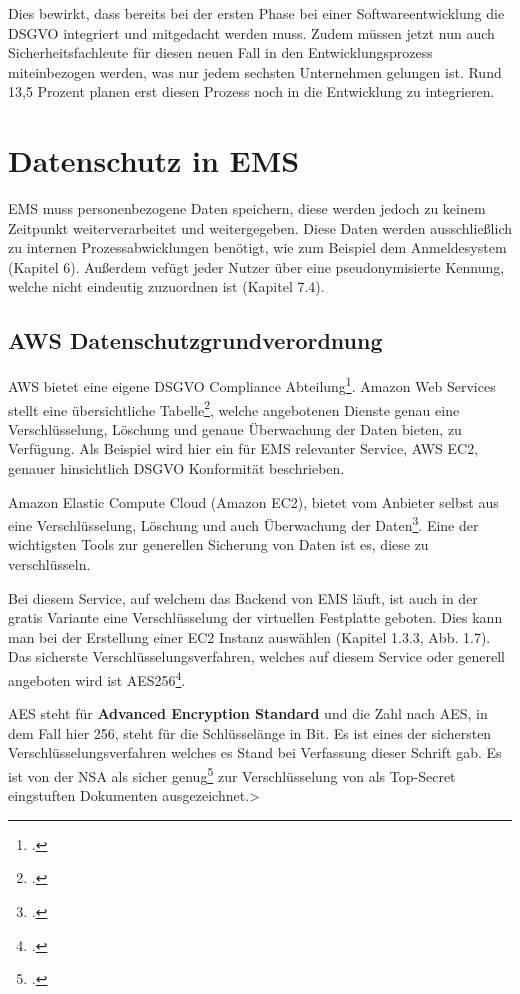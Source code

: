 Dies bewirkt, dass bereits bei der ersten Phase bei einer Softwareentwicklung die DSGVO integriert und mitgedacht werden muss.
Zudem müssen jetzt nun auch Sicherheitsfachleute für diesen neuen Fall in den Entwicklungsprozess miteinbezogen werden, was nur jedem sechsten Unternehmen gelungen ist.
Rund 13,5 Prozent planen erst diesen Prozess noch in die Entwicklung zu integrieren.

\section{Datenschutz in EMS}
EMS muss personenbezogene Daten speichern, diese werden jedoch zu keinem Zeitpunkt weiterverarbeitet und weitergegeben. Diese Daten werden ausschließlich zu internen Prozessabwicklungen benötigt, wie zum Beispiel dem
Anmeldesystem (Kapitel 6). Außerdem vefügt jeder Nutzer über eine pseudonymisierte Kennung, welche nicht eindeutig zuzuordnen ist (Kapitel 7.4).

\subsection{AWS Datenschutzgrundverordnung}
AWS bietet eine eigene DSGVO Compliance Abteilung\footcite{aws-dsgvo}. Amazon Web Services stellt eine übersichtliche Tabelle\footcite{AWS-DSGVO-Tabelle}, welche angebotenen Dienste genau eine Verschlüsselung, Löschung und 
genaue Überwachung der Daten bieten, zu Verfügung. Als Beispiel wird hier ein für EMS relevanter Service, AWS EC2, genauer hinsichtlich DSGVO Konformität beschrieben.

Amazon Elastic Compute Cloud (Amazon EC2), bietet vom Anbieter selbst aus eine Verschlüsselung, Löschung und auch Überwachung der Daten\footcite{aws-ec2-dsgvo-alles}.
Eine der wichtigsten Tools zur generellen Sicherung von Daten ist es, diese zu verschlüsseln.

Bei diesem Service, auf welchem das Backend von EMS läuft, ist auch in der gratis Variante eine Verschlüsselung der virtuellen Festplatte geboten. Dies kann man bei der Erstellung einer EC2 Instanz auswählen
(Kapitel 1.3.3, Abb. 1.7). Das sicherste Verschlüsselungsverfahren, welches auf diesem Service oder generell angeboten wird ist AES256\footcite{aes256}.

AES steht für \textbf{Advanced Encryption Standard} und die Zahl nach AES, in dem
Fall hier 256, steht für die Schlüsselänge in Bit. Es ist eines der sichersten Verschlüsselungsverfahren welches es Stand bei Verfassung dieser Schrift gab. Es ist von der NSA als sicher genug\footcite{nsa-aws} zur Verschlüsselung von als Top-Secret
eingstuften Dokumenten ausgezeichnet.>

